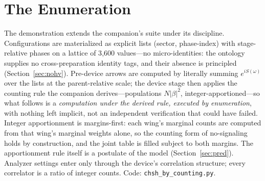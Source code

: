 \documentclass[11pt]{article}
\theoremstyle{definition}
\theoremstyle{remark}
\begin{document}
\section{The Enumeration}\label{sec:verif}
The demonstration extends the companion's suite under its discipline. Configurations are materialized as explicit lists (sector, phase-index) with stage-relative phases on a lattice of 3{,}600 values---no micro-identities: the ontology supplies no cross-preparation identity tags, and their absence is principled (Section~\ref{sec:nohv}). Pre-device arrows are computed by literally summing $e^{iS(\omega)}$ over the lists at the parent-relative scale; the device stage then applies the counting rule the companion derives---populations $N|\beta|^2$, integer-apportioned---so what follows is a \emph{computation under the derived rule, executed by enumeration}, with nothing left implicit, not an independent verification that could have failed. Integer apportionment is margins-first: each wing's marginal counts are computed from that wing's marginal weights alone, so the counting form of no-signaling holds by construction, and the joint table is filled subject to both margins. The apportionment rule itself is a postulate of the model (Section~\ref{sec:pred}). Analyzer settings enter only through the device's correlation structure; every correlator is a ratio of integer counts. Code: \texttt{chsh\_by\_counting.py}.
\end{document}
